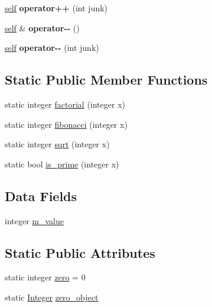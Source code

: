 \begin{DoxyCompactItemize}
\hyperlink{classez_1_1objects_1_1Integer}{self} {\bfseries operator++} (int junk)
\item 
\mbox{\label{classez_1_1objects_1_1Integer_a1da5a005cd4ae1e2741e5ddb70b75673}} 
\hyperlink{classez_1_1objects_1_1Integer}{self} \& {\bfseries operator-\/-\/} ()
\item 
\mbox{\label{classez_1_1objects_1_1Integer_ab048d4dcc7bbdd14c632aee899a13e98}} 
\hyperlink{classez_1_1objects_1_1Integer}{self} {\bfseries operator-\/-\/} (int junk)
\end{DoxyCompactItemize}
\subsection*{Static Public Member Functions}
\begin{DoxyCompactItemize}
\item 
static integer \hyperlink{classez_1_1objects_1_1Integer_a16573c56739262f5a869774c2a090d27}{factorial} (integer x)
\item 
static integer \hyperlink{classez_1_1objects_1_1Integer_ad85fb9d0675b07672d5dc9a8903e855c}{fibonacci} (integer x)
\item 
static integer \hyperlink{classez_1_1objects_1_1Integer_aebf04168540a887d84e74df2df79a404}{sqrt} (integer x)
\item 
static bool \hyperlink{classez_1_1objects_1_1Integer_a27467dd30f1b4d62119bc5630f6633d6}{is\+\_\+prime} (integer x)
\end{DoxyCompactItemize}
\subsection*{Data Fields}
\begin{DoxyCompactItemize}
\item 
integer \hyperlink{classez_1_1objects_1_1Integer_aafa80bd51f80360ca9f13e740ecd13ff}{m\+\_\+value}
\end{DoxyCompactItemize}
\subsection*{Static Public Attributes}
\begin{DoxyCompactItemize}
\item 
static integer \hyperlink{classez_1_1objects_1_1Integer_a55fb158fee3051e1dc48aa12e95b3890}{zero} = 0
\item 
static \hyperlink{classez_1_1objects_1_1Integer}{Integer} \hyperlink{classez_1_1objects_1_1Integer_a2a58362ca8067e5b72afa37968ad28ee}{zero\+\_\+object}
\end{DoxyCompactItemize}
